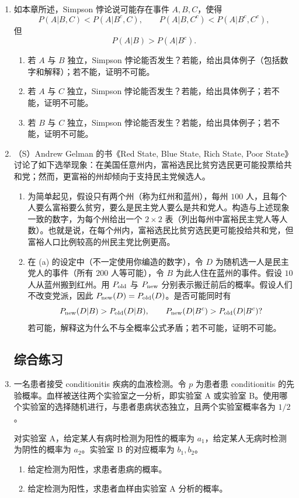 \documentclass[UTF8,12pt,a4paper,fontset=fandol]{ctexart}
\begin{document}
\begin{enumerate}
  \item 如本章所述，Simpson 悖论说可能存在事件 $A,B,C$，使得
  \[
    P(A|B,C)<P(A|B^c,C),\qquad
    P(A|B,C^c)<P(A|B^c,C^c),
  \]
  但
  \[
    P(A|B)>P(A|B^c).
  \]
  \begin{enumerate}
    \item 若 $A$ 与 $B$ 独立，Simpson 悖论能否发生？若能，给出具体例子（包括数字和解释）；若不能，证明不可能。
    \item 若 $A$ 与 $C$ 独立，Simpson 悖论能否发生？若能，给出具体例子；若不能，证明不可能。
    \item 若 $B$ 与 $C$ 独立，Simpson 悖论能否发生？若能，给出具体例子；若不能，证明不可能。
  \end{enumerate}

  \item （S）Andrew Gelman 的书《Red State, Blue State, Rich State, Poor State》讨论了如下选举现象：在美国任意州内，富裕选民比贫穷选民更可能投票给共和党；然而，更富裕的州却倾向于支持民主党候选人。
  \begin{enumerate}
    \item 为简单起见，假设只有两个州（称为红州和蓝州），每州 $100$ 人，且每个人要么富裕要么贫穷，要么是民主党人要么是共和党人。构造与上述现象一致的数字，为每个州给出一个 $2\times 2$ 表（列出每州中富裕民主党人等人数）。也就是说，在每个州内，富裕选民比贫穷选民更可能投给共和党，但富裕人口比例较高的州民主党比例更高。
    \item 在 (a) 的设定中（不一定使用你编造的数字），令 $D$ 为随机选一人是民主党人的事件（所有 $200$ 人等可能），令 $B$ 为此人住在蓝州的事件。假设 $10$ 人从蓝州搬到红州。用 $P_{\rm old}$ 与 $P_{\rm new}$ 分别表示搬迁前后的概率。假设人们不改变党派，因此 $P_{\rm new}(D)=P_{\rm old}(D)$。是否可能同时有
    \[
      P_{\rm new}(D|B)>P_{\rm old}(D|B),\qquad
      P_{\rm new}(D|B^c)>P_{\rm old}(D|B^c)?
    \]
    若可能，解释这为什么不与全概率公式矛盾；若不可能，证明不可能。
  \end{enumerate}

\subsection*{综合练习}

  \item 一名患者接受 conditionitis 疾病的血液检测。令 $p$ 为患者患 conditionitis 的先验概率。血样被送往两个实验室之一分析，即实验室 A 或实验室 B。使用哪个实验室的选择随机进行，与患者患病状态独立，且两个实验室概率各为 $1/2$。

  对实验室 A，给定某人有病时检测为阳性的概率为 $a_1$，给定某人无病时检测为阴性的概率为 $a_2$。实验室 B 的对应概率为 $b_1,b_2$。
  \begin{enumerate}
    \item 给定检测为阳性，求患者患病的概率。
    \item 给定检测为阳性，求患者血样由实验室 A 分析的概率。
  \end{enumerate}


\end{enumerate}
\end{document}
